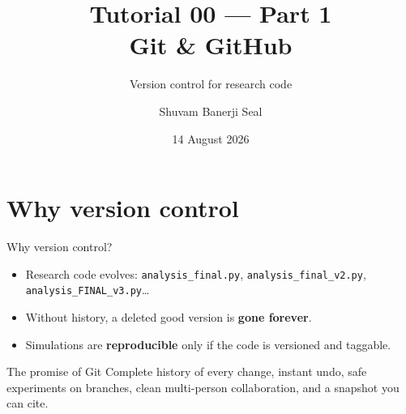 \documentclass[aspectratio=169]{beamer}
\title[Git \& GitHub]{Tutorial 00 --- Part 1\\[2pt] Git \& GitHub}
\subtitle{Version control for research code}
\author[SBS]{Shuvam Banerji Seal}
\institute[CH4114]{CH4114 --- Molecular Simulation}
\date[Aug 2026]{14 August 2026}
\begin{document}
\begin{frame}[plain]
  \titlepage
  \par
  \vspace{0.1cm}
\end{frame}

\section{Why version control}

\begin{frame}{Why version control?}
  \begin{itemize}
    \item Research code evolves: \texttt{analysis\_final.py},
          \texttt{analysis\_final\_v2.py}, \texttt{analysis\_FINAL\_v3.py}\ldots
    \item Without history, a deleted good version is \textbf{gone forever}.
    \item Simulations are \textbf{reproducible} only if the code is versioned
          and taggable.
  \end{itemize}
  \vspace{0.3cm}
  \begin{block}{The promise of Git}
    Complete history of every change, instant undo, safe experiments on
    branches, clean multi-person collaboration, and a snapshot you can cite.
  \end{block}
\end{frame}
\end{document}
